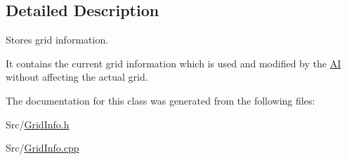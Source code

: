 \subsection{Detailed Description}
Stores grid information. 

It contains the current grid information which is used and modified by the \hyperlink{classAI}{A\-I} without affecting the actual grid. 

The documentation for this class was generated from the following files\-:\begin{DoxyCompactItemize}
\item 
Src/\hyperlink{GridInfo_8h}{Grid\-Info.\-h}\item 
Src/\hyperlink{GridInfo_8cpp}{Grid\-Info.\-cpp}\end{DoxyCompactItemize}
